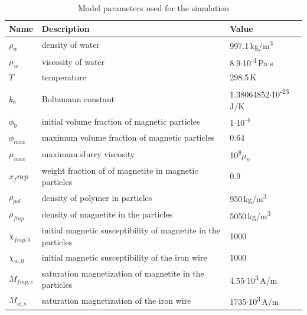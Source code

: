 \begin{table}[H]
\centering
\caption[Model parameters]{Model parameters used for the simulation}
\label{table:param_mod}
\begin{tabularx}{\textwidth}{XXX}\hline
Name & Description & Value \\
\hline\hline
$\rho_{w}$ & density of water &  997.1\,kg/m\textsuperscript{3}\\
$\mu_{w}$ & viscosity of water & 8.9$\cdotp$10\textsuperscript{-4}\,Pa$\cdotp$s\\
$T$ & temperature & 298.5\,K\\
$k_{b}$ & Boltzmann constant & 1.38064852$\cdotp$10\textsuperscript{-23}\,J/K\\
$\phi_{0}$ & initial volume fraction of magnetic particles & 1$\cdotp$10\textsuperscript{-4}\\
$\phi_{max}$ & maximum volume fraction of magnetic particles & 0.64\\
$\mu_{max}$ & maximum slurry viscosity & 10\textsuperscript{8}$\mu_{w}$\\
$x_fmp$ & weight fraction of of magnetite in magnetic particles & 0.9\\
$\rho_{pol}$ & density of polymer in particles & 950\,kg/m\textsuperscript{3}\\
$\rho_{fmp}$ & density of magnetite in the particles & 5050\,kg/m\textsuperscript{3}\\
$\chi_{fmp,0}$ & initial magnetic susceptibility of magnetite in the particles & 1000\\
$\chi_{w,0}$ & initial magnetic susceptibility of the iron wire & 1000\\
$M_{fmp,s}$ & saturation magnetization of magnetite in the particles & 4.55$\cdotp$10\textsuperscript{3}\,A/m\\
$M_{w,s}$ & saturation magnetization of the iron wire & 1735$\cdotp$10\textsuperscript{3}\,A/m\\
\hline
\end{tabularx}
\end{table}

